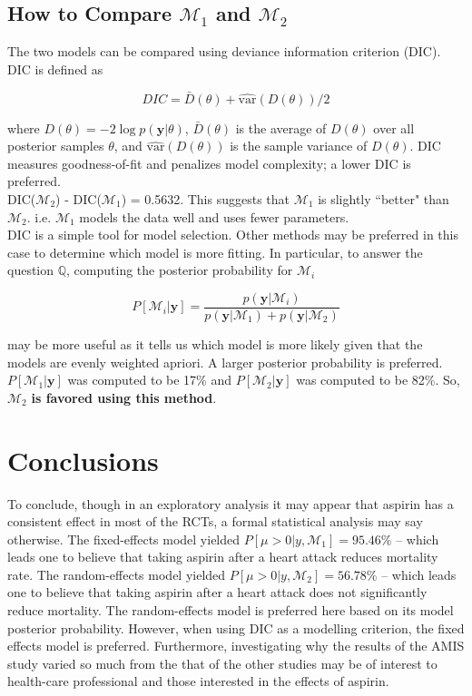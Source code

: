 \documentclass{../../tex_template/asaproc}
\newcommand{\p}[1]{\left(#1\right)}
\newcommand{\bk}[1]{\left[#1\right]}
\newcommand{\ds}{ \displaystyle }
\newcommand{\M}{\mathcal{M}}
\newcommand{\Q}{\mathbb{Q}}
\begin{document}
\subsection{How to Compare $\M_1$ and $\M_2$}
The two models can be compared using deviance information criterion (DIC).
DIC is defined as 

$$
DIC = \bar{D}(\theta) + \widehat{\text{var}}\p{D(\theta)} / 2
$$

where $D(\theta)= -2\log p(\bm y|\theta)$, $\bar{D}(\theta)$ is the average of
$D(\theta)$ over all posterior samples $\theta$, and
$\widehat{\text{var}}(D(\theta))$ is the sample variance of $D(\theta)$. DIC
measures goodness-of-fit and penalizes model complexity; a lower DIC is
preferred. \\

DIC($\M_2$) - DIC($\M_1$) = 0.5632. This suggests that $\M_1$ is slightly
``better" than $\M_2$. i.e. $\M_1$ models the data well and uses fewer
parameters.\\

DIC is a simple tool for model selection. Other methods may be preferred 
in this case to determine which model is more fitting. In particular,
to answer the question $\Q$, computing the posterior probability
for $\M_i$

$$
P\bk{\M_i|\bm y} = \ds\frac{p(\bm y|\M_i)}{p(\bm y|\M_1)+p(\bm y|\M_2)}
$$

may be more useful as it tells us which model is more likely given that the
models are evenly weighted apriori. A larger posterior probability is
preferred. $P\bk{\M_1|\bm y}$ was computed to be 17\% and $P\bk{\M_2|\bm y}$
was computed to be 82\%. So, $\M_2$ \textbf{is favored using this method}.\\


\section{Conclusions}
To conclude, though in an exploratory analysis it may appear that aspirin has a
consistent effect in most of the RCTs, a formal statistical analysis may say
otherwise. The fixed-effects model yielded $P\bk{\mu > 0 | y, \M_1} = 95.46\%$
-- which leads one to believe that taking aspirin after a heart attack reduces
mortality rate. The random-effects model yielded $P\bk{\mu > 0 | y, \M_2} = 56.78\%$
-- which leads one to believe that taking aspirin after a heart attack does
not significantly reduce mortality. The random-effects model is preferred here
based on its model posterior probability. However, when using DIC as a
modelling criterion, the fixed effects model is preferred. Furthermore,
investigating why the results of the AMIS study varied so much from the
that of the other studies may be of interest to health-care professional
and those interested in the effects of aspirin.
\end{document}
